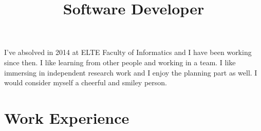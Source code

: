 \documentclass[12pt,a4paper,sans]{moderncv}   %
\title{Software Developer}                          %
\begin{document}
\makecvtitle


I've absolved in 2014 at ELTE Faculty of Informatics and I have been working since then. I like learning from other people and working in a team. I like immersing in independent research work and I enjoy the planning part as well. I would consider myself a cheerful and smiley person.

\section{Work Experience}
\end{document}

